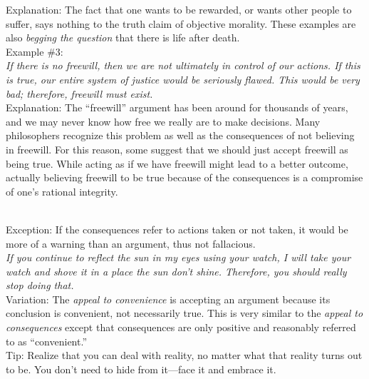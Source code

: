 \documentclass[a4paper,12pt,single,pdftex]{scrartcl}
\begin{document}
{    
      Explanation: The fact that one wants to be rewarded, or wants other people to suffer, says nothing to the truth claim of objective morality.  These examples are also {\it begging the question}  that there is life after death.
    \\

    
      Example \#3:
    \\

    
      {\em If there is no freewill, then we are not ultimately in control of our actions. If this is true, our entire system of justice would be seriously flawed. This would be very bad; therefore, freewill must exist.}
    \\

    
      Explanation: The “freewill” argument has been around for thousands of years, and we may never know how free we really are to make decisions. Many philosophers recognize this problem as well as the consequences of not believing in freewill. For this reason, some suggest that we should just accept freewill as being true. While acting as if we have freewill might lead to a better outcome, actually believing freewill to be true because of the consequences is a compromise of one’s rational integrity. \newline

    \\

    
      Exception: If the consequences refer to actions taken or not taken, it would be more of a warning than an argument, thus not fallacious.
    \\

    
      {\em If you continue to reflect the sun in my eyes using your watch, I will take your watch and shove it in a place the sun don’t shine. Therefore, you should really stop doing that.}
    \\

    
      Variation: The {\em appeal to convenience} is accepting an argument because its conclusion is convenient, not necessarily true. This is very similar to the {\em appeal to consequences} except that consequences are only positive and reasonably referred to as “convenient.”
    \\

    
      Tip: Realize that you can deal with reality, no matter what that reality turns out to be.  You don’t need to hide from it—face it and embrace it.
    \\

  }
\end{document}
